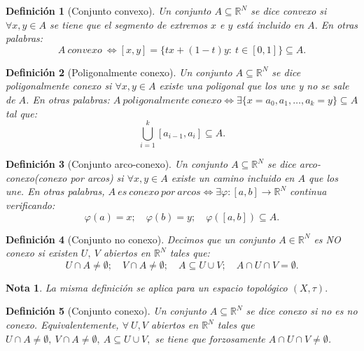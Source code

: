 \documentclass[11pt, a4paper]{article}
\theoremstyle{theorem-style}
\theoremstyle{definition-style}
\newtheorem*{ndef}{Definición}
\theoremstyle{remark-style}
\newtheorem*{nota}{Nota}
\theoremstyle{example-style}
\begin{document}
\begin{ndef}[Conjunto convexo]
Un conjunto $A\subseteq \mathbb{R}^N$ se dice \textit{convexo} si $\forall x,y \in A$ se tiene que el segmento de extremos $x$ e $y$ está incluido en $A$. En otras palabras: $$A\ convexo\ \iff [x,y] = \{tx + (1-t)y: \ t\in [0,1]\} \subseteq A.$$
\end{ndef}



\begin{ndef}[Poligonalmente conexo]
Un conjunto $A\subseteq \mathbb{R}^N$ se dice \textit{poligonalmente conexo} si  $\forall x,y \in A$ existe una poligonal que los une y no se sale de $A$. En otras palabras:  $A\ poligonalmente\ conexo \iff \exists \{x= a_0, a_1,\dots,a_k=y \}\subseteq A$ tal que: $$\bigcup_{i=1}^k [a_{i-1},a_i] \subseteq A.$$
\end{ndef}



\begin{ndef}[Conjunto arco-conexo]
Un conjunto $A \subseteq \mathbb{R}^N$ se dice \emph{arco-conexo(conexo por arcos)} si $\forall x,y \in A$ existe un camino incluido en $A$ que los une. En otras palabras,  $A\ es\ conexo\ por\ arcos \iff \exists \varphi:[a,b] \longrightarrow \mathbb{R}^N$ continua verificando: $$\varphi(a) = x;\quad \varphi(b) = y;\quad \varphi([a,b]) \subseteq A.$$
\end{ndef}



\begin{ndef}[Conjunto no conexo]
Decimos que un conjunto $A\in \mathbb{R}^N$ es \textit{NO conexo} si existen $U,\ V$ abiertos en $\mathbb{R}^N$ tales que: $$U \cap A \ne \emptyset;\quad V \cap A \ne \emptyset;\quad A \subseteq U \cup V;\quad A \cap U \cap V = \emptyset.$$
\end{ndef}



\begin{nota}
La misma definición se aplica para un espacio topológico $(X,\tau).$
\end{nota}



\begin{ndef}[Conjunto conexo]
Un conjunto $A\subseteq \mathbb{R}^N$ se dice conexo si no es no conexo. Equivalentemente, $\forall \ U,V$ abiertos en $\mathbb{R}^N$ tales que $U \cap A \ne \emptyset, \ V \cap A \ne \emptyset,\ A \subseteq U \cup V,$ se tiene que forzosamente $A \cap U \cap V \ne \emptyset$.
\end{ndef}
\end{document}
